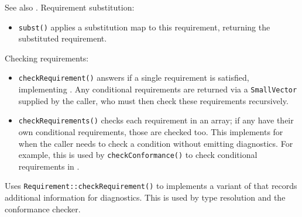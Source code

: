 \documentclass[../generics]{subfiles}
\begin{document}
See also . Requirement substitution:
\begin{itemize}
\item \texttt{subst()} applies a substitution map to this requirement, returning the substituted requirement.
\end{itemize}
Checking requirements:
\begin{itemize}
\item \texttt{checkRequirement()} answers if a single requirement is satisfied, implementing . Any conditional requirements are returned via a \texttt{SmallVector} supplied by the caller, who must then check these requirements recursively. 
\item \texttt{checkRequirements()} checks each requirement in an array; if any have their own conditional requirements, those are checked too. This implements  for when the caller needs to check a condition without emitting diagnostics. For example, this is used by \texttt{checkConformance()} to check conditional requirements in .
\end{itemize}

Uses \texttt{Requirement::checkRequirement()} to implements a variant of  that records additional information for diagnostics. This is used by type resolution and the conformance checker.
\end{document}

